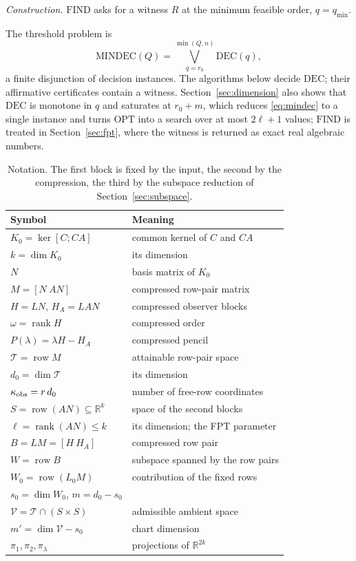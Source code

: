 \documentclass[journal]{IEEEtran}
\theoremstyle{plainn}
\theoremstyle{remark}
\begin{document}
\emph{Construction.} $\mathrm{FIND}$ asks for a witness $R$ at the minimum feasible
order, $q=q_{\min}$.

The threshold problem is
\begin{equation}\label{eq:mindec}
\mathrm{MINDEC}(Q)=\bigvee_{q=r_0}^{\min(Q,n)}\mathrm{DEC}(q),
\end{equation}
a finite disjunction of decision instances. The algorithms below decide $\mathrm{DEC}$;
their affirmative certificates contain a witness. Section~\ref{sec:dimension} also shows
that $\mathrm{DEC}$ is monotone in $q$ and saturates at $r_0+m$, which reduces
\eqref{eq:mindec} to a single instance and turns $\mathrm{OPT}$ into a search over at most
$2\ell+1$ values; $\mathrm{FIND}$ is treated in Section~\ref{sec:fpt}, where the witness is
returned as exact real algebraic numbers.

\begin{table}[!t]
\centering
\caption{Notation. The first block is fixed by the input, the second by the compression, the third by
the subspace reduction of Section~\ref{sec:subspace}.}
\label{tab:notation}
\footnotesize
\begin{tabular}{@{}ll@{}}
\toprule
Symbol & Meaning \\
\midrule
$K_0=\ker[C;CA]$ & common kernel of $C$ and $CA$ \\
$k=\dim K_0$ & its dimension \\
$N$ & basis matrix of $K_0$ \\
$M=[N\ AN]$ & compressed row-pair matrix \\
\midrule
$H=LN$, $H_A=LAN$ & compressed observer blocks \\
$\omega=\operatorname{rank}H$ & compressed order \\
$P(\lambda)=\lambda H-H_A$ & compressed pencil \\
\midrule
$\mathcal T=\operatorname{row}M$ & attainable row-pair space \\
$d_0=\dim\mathcal T$ & its dimension \\
$\kappa_{\rm obs}=r\,d_0$ & number of free-row coordinates \\
$S=\operatorname{row}(AN)\subseteq\mathbb R^k$ & space of the second blocks \\
$\ell=\operatorname{rank}(AN)\le k$ & its dimension; the FPT parameter \\
$B=LM=[H\ H_A]$ & compressed row pair \\
$W=\operatorname{row}B$ & subspace spanned by the row pairs \\
$W_0=\operatorname{row}(L_0M)$ & contribution of the fixed rows \\
$s_0=\dim W_0$, $m=d_0-s_0$ & \\
$\mathcal V=\mathcal T\cap(S\times S)$ & admissible ambient space \\
$m'=\dim\mathcal V-s_0$ & chart dimension \\
$\pi_1,\pi_2,\pi_\lambda$ & projections of $\mathbb R^{2k}$ \\
\bottomrule
\end{tabular}
\end{table}
\end{document}
